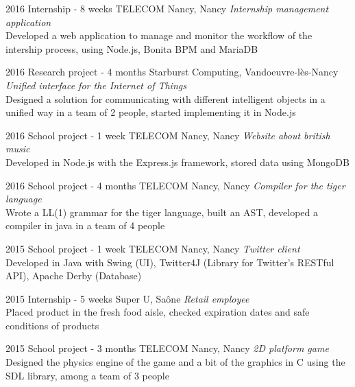 \documentclass[]{lemaki-cv}
\begin{document}
		\begin{entrylist}


			\entry
			{2016}
			{Internship {\normalfont - 8 weeks}}
			{TELECOM Nancy, Nancy}
			{\emph{Internship management application} \\
			Developed a web application to manage and monitor the workflow of the
			intership process, using Node.js, Bonita BPM and MariaDB}


			\entry
			{2016}
			{Research project {\normalfont - 4 months}}
			{Starburst Computing, Vandoeuvre-lès-Nancy}
			{\emph{Unified interface for the Internet of Things} \\
			Designed a solution for communicating with different intelligent objects in
			a unified way in a team of 2 people, started implementing it in Node.js}


			\entry
			{2016}
			{School project {\normalfont - 1 week}}
			{TELECOM Nancy, Nancy}
			{\emph{Website about british music} \\
			Developed in Node.js with the Express.js framework, stored data using MongoDB}


			\entry
			{2016}
			{School project {\normalfont - 4 months}}
			{TELECOM Nancy, Nancy}
			{\emph{Compiler for the tiger language} \\
			Wrote a LL(1) grammar for the tiger language, built an AST, developed a
			compiler in java in a team of 4 people}


			\entry
			{2015}
			{School project {\normalfont - 1 week}}
			{TELECOM Nancy, Nancy}
			{\emph{Twitter client} \\
			Developed in Java with Swing (UI), Twitter4J (Library for Twitter's RESTful
			API), Apache Derby (Database)}


			\entry
			{2015}
			{Internship {\normalfont - 5 weeks}}
			{Super U, Saône}
			{\emph{Retail employee} \\
			Placed product in the fresh food aisle, checked expiration dates and safe conditions of products}


			\entry
			{2015}
			{School project {\normalfont - 3 months}}
			{TELECOM Nancy, Nancy}
			{\emph{2D platform game} \\
			Designed the physics engine of the game and a bit of the graphics in C using
			the SDL library, among a team of 3 people}


		\end{entrylist}
	
\end{document}
